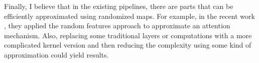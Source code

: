 Finally, I believe that in the existing pipelines, there are parts that
can be efficiently approximated using randomized maps.
For example, in the recent work \citep{choromanski2020rethinking}, they applied
the random features approach to approximate an attention mechanism.
Also, replacing some traditional layers or computations
with a more complicated kernel version and then reducing the complexity
using some kind of approximation could yield results.









